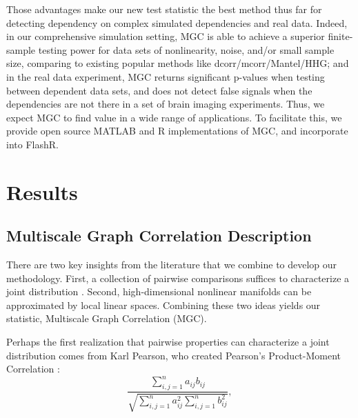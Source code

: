 \documentclass[11pt]{article}
\begin{document}
Those advantages make our new test statistic the best method thus far for detecting dependency on complex simulated dependencies and real data. Indeed, in our comprehensive simulation setting, MGC is able to achieve a superior finite-sample testing power for data sets of nonlinearity, noise, and/or small sample size, comparing to existing popular methods like dcorr/mcorr/Mantel/HHG; and in the real data experiment, MGC returns significant p-values when testing between dependent data sets,  and does not detect false signals when the dependencies are not there in a set of brain imaging experiments. Thus, we expect MGC to find value in a wide range of applications.  To facilitate this, we provide open source MATLAB and R implementations of MGC, and incorporate into FlashR.

\section{Results}
\label{main}
\subsection{Multiscale Graph Correlation Description}
\label{main1}
There are two key insights from the literature that we combine to develop our methodology.  First, a collection of pairwise comparisons  suffices to characterize a joint distribution \cite{Maa1996}.  Second, high-dimensional nonlinear manifolds can be approximated by local linear spaces.  Combining these two ideas yields our statistic,  Multiscale Graph Correlation (MGC).  

Perhaps the first realization that pairwise properties can characterize a joint distribution comes from  Karl Pearson, who created Pearson's Product-Moment Correlation \cite{Pearson1895}:
\begin{equation}
\label{generalCoef}
\frac{\sum_{i,j=1}^n a_{ij} b_{ij}}{\sqrt{\sum_{i,j=1}^n  a_{ij}^{2} \sum_{i,j=1}^n b_{ij}^{2}}}, 
\end{equation}
\end{document}
